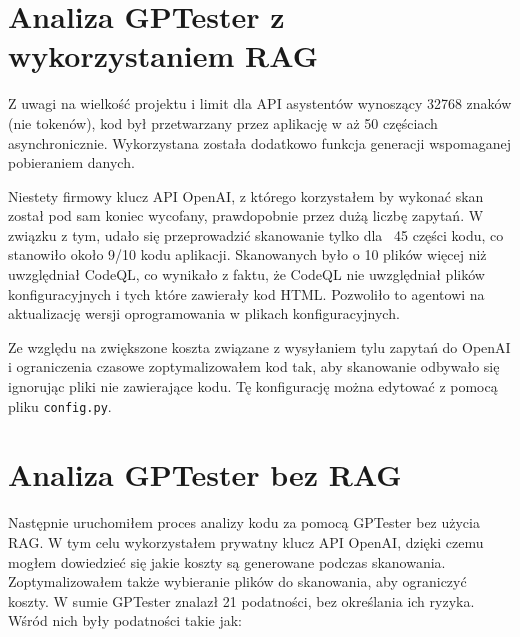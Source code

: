 \begin{table}[!ht]
  \centering
  \caption{Extended Scanning Results with CodeQL}
  \label{table:codeql_extended_results}
\end{table}


\section{Analiza GPTester z wykorzystaniem RAG}
Z uwagi na wielkość projektu i limit dla API asystentów wynoszący 32768 znaków (nie tokenów), kod był przetwarzany przez aplikację w aż 50 częściach asynchronicznie. Wykorzystana została dodatkowo funkcja generacji wspomaganej pobieraniem danych. 

Niestety firmowy klucz API OpenAI, z którego korzystałem by wykonać skan został pod sam koniec wycofany, prawdopobnie przez dużą liczbę zapytań. W związku z tym, udało się przeprowadzić skanowanie tylko dla ~45 części kodu, co stanowiło około 9/10 kodu aplikacji. Skanowanych było o 10 plików więcej niż uwzględniał CodeQL, co wynikało z faktu, że CodeQL nie uwzględniał plików konfiguracyjnych i tych które zawierały kod HTML. 
Pozwoliło to agentowi na aktualizację wersji oprogramowania w plikach konfiguracyjnych.

Ze względu na zwiększone koszta związane z wysyłaniem tylu zapytań do OpenAI i ograniczenia czasowe zoptymalizowałem kod tak, aby skanowanie odbywało się ignorując pliki nie zawierające kodu. Tę konfigurację można edytować z pomocą pliku \texttt{config.py}.
\section{Analiza GPTester bez RAG}
Następnie uruchomiłem proces analizy kodu za pomocą GPTester bez użycia RAG. W tym celu wykorzystałem prywatny klucz API OpenAI, dzięki czemu mogłem dowiedzieć się jakie koszty są generowane podczas skanowania. Zoptymalizowałem także wybieranie plików do skanowania, aby ograniczyć koszty. 
W sumie GPTester znalazł 21 podatności, bez określania ich ryzyka. Wśród nich były podatności takie jak:\\


